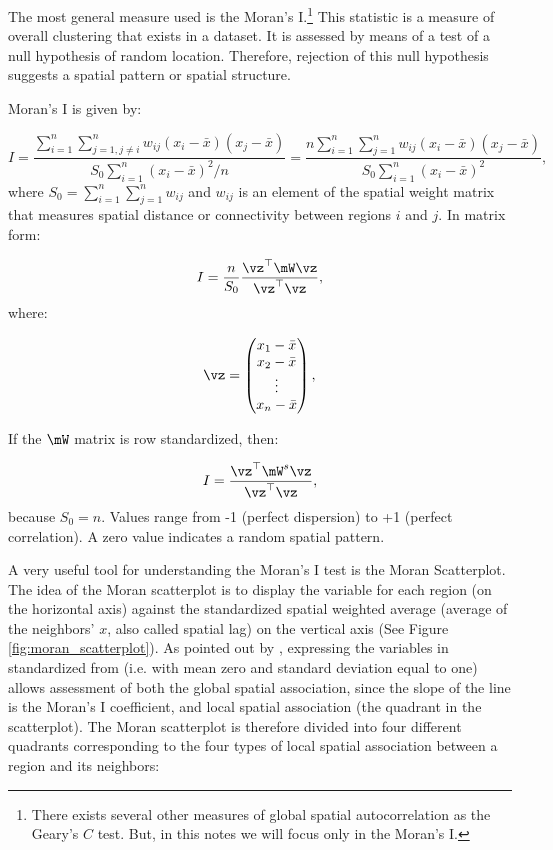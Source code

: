\documentclass[english,12pt]{book}\usepackage[]{graphicx}\usepackage[]{xcolor}
\begin{document}
The most general measure used is the Moran's I.\footnote{There exists several other measures of global spatial autocorrelation as the Geary's $C$ test. But, in this notes we will focus only in the Moran's I.} This statistic is a measure of overall clustering that exists in a dataset. It is assessed by means of a test of a null hypothesis of random location. Therefore, rejection of this null hypothesis suggests a spatial pattern or spatial structure. 

Moran's I is given by:

\begin{equation}\label{eq:I-moran}
I = \frac{\sum_{i = 1}^n\sum_{j=1, j\neq i}^n w_{ij}\left(x_i - \bar{x}\right)\left(x_j - \bar{x}\right)}{S_0 \sum_{i = 1}^n\left(x_i - \bar{x}\right)^2/n} = \frac{n\sum_{i = 1}^n\sum_{j=1}^n w_{ij}\left(x_i - \bar{x}\right)\left(x_j - \bar{x}\right)}{S_0 \sum_{i = 1}^n\left(x_i - \bar{x}\right)^2},
\end{equation}
%
where $S_0=\sum_{i = 1}^n\sum_{j=1}^nw_{ij}$ and $w_{ij}$ is an element of the spatial weight matrix that measures spatial distance or connectivity between regions $i$ and $j$. In matrix form:

\begin{equation*}
	I = \frac{n}{S_0} \frac{\vz^\top\mW\vz}{\vz^\top\vz},
\end{equation*}
%
where: 

\begin{equation*}
\vz = \begin{pmatrix}
          x_1 - \bar{x}\\
          x_2 - \bar{x} \\
          \vdots\\
          x_n - \bar{x}
      \end{pmatrix},
\end{equation*}

If the $\mW$ matrix is row standardized, then:

\begin{equation*}
	I = \frac{\vz^\top\mW^s\vz}{\vz^\top\vz},
\end{equation*}
%
because $S_0=n$. Values range from -1 (perfect dispersion) to +1 (perfect correlation). A zero value indicates a random spatial pattern. 

A very useful tool for understanding the Moran’s I test is the Moran Scatterplot. The idea of the Moran scatterplot is to display the variable for each region (on the horizontal axis) against the standardized spatial weighted average (average of the neighbors' $x$, also called spatial lag) on the vertical axis (See Figure \ref{fig:moran_scatterplot}). As pointed out by \cite{anselin1996chapter}, expressing the variables in standardized from (i.e. with mean zero and standard deviation equal to one) allows assessment of both the global spatial association, since the slope of the line is the Moran's I coefficient, and local spatial association (the quadrant in the scatterplot). The Moran scatterplot is therefore divided into four different quadrants corresponding to the four types of local spatial association between a region and its neighbors:
\end{document}

